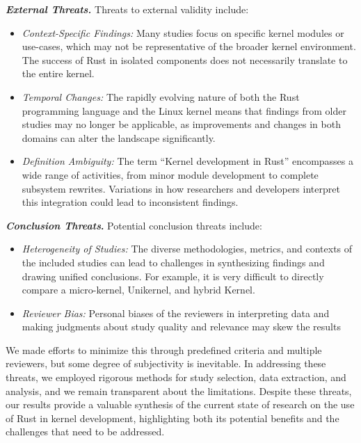 \documentclass[sigconf]{acmart}
\begin{document}
\textit{\textbf{External Threats.}} Threats to external validity include:

\begin{itemize}
  \item \textit{Context-Specific Findings:} Many studies focus on specific kernel modules or use-cases, which
    may not be representative of the broader kernel environment. The success of Rust in isolated
    components does not necessarily translate to the entire kernel.
  \item \textit{Temporal Changes:} The rapidly evolving nature of both the Rust programming language and the
    Linux kernel means that findings from older studies may no longer be applicable, as improvements
    and changes in both domains can alter the landscape significantly.
    \item \textit{Definition Ambiguity:} The term ``Kernel development in Rust'' encompasses a wide range of activities,
    from minor module development to complete subsystem rewrites. Variations in how researchers and
    developers interpret this integration could lead to inconsistent findings.
\end{itemize}


\textbf{\textit{Conclusion Threats}.} Potential conclusion threats include:

\begin{itemize}
  \item \textit{Heterogeneity of Studies:} The diverse methodologies, metrics, and contexts of the included studies
    can lead to challenges in synthesizing findings and drawing unified conclusions. For example, it
    is very difficult to directly compare a micro-kernel, Unikernel, and hybrid Kernel.
  \item \textit{Reviewer Bias:} Personal biases of the reviewers in interpreting data and making judgments
    about study quality and relevance may skew the results
\end{itemize}

We made efforts to minimize this through predefined criteria and multiple reviewers, but some
degree of subjectivity is inevitable.  In addressing these threats, we employed rigorous methods for
study selection, data extraction, and analysis, and we remain transparent about the
limitations. Despite these threats, our results provide a valuable synthesis of the current
state of research on the use of Rust in kernel development, highlighting both its potential benefits
and the challenges that need to be addressed.
\end{document}
